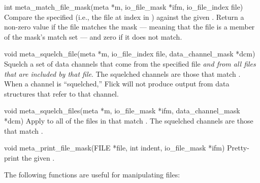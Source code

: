 \begin{cprototypelist}
  \item[int meta_match_file_mask(meta *m, io_file_mask *ifm,
                                 io_file_index file)]
  Compare the specified  (i.e., the file at index
   in ) against the given
  .  Return a non-zero value if the file matches the mask
  --- meaning that the file is a member of the mask's match set --- and zero if
  it does not match.

  \item[void meta_squelch_file(meta *m, io_file_index file,
                               data_channel_mask *dcm)]
  Squelch a set of data channels that come from the specified file \emph{and
  from all files that are included by that file}.  The squelched channels are
  those that match .  When a channel is ``squelched,'' Flick
  will not produce output from data structures that refer to that channel.

  \item[void meta_squelch_files(meta *m, io_file_mask *ifm,
                                data_channel_mask *dcm)]
  Apply  to all of the files in 
  that match .  The squelched channels are those that match
  .

  \item[void meta_print_file_mask(FILE *file, int indent, io_file_mask *ifm)]
  Pretty-print the given .
\end{cprototypelist}


\noindent The following functions are useful for manipulating files:

